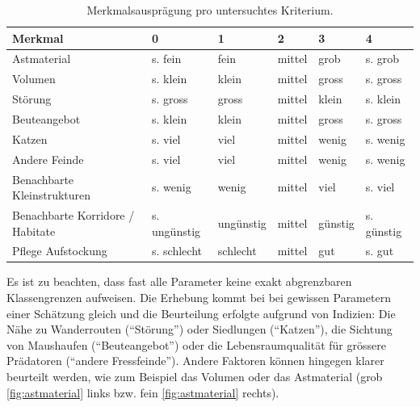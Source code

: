 \documentclass[
  oneside]{scrbook}
\begin{document}
\begin{table}

\caption{\label{tab:unnamed-chunk-3}Merkmalsausprägung pro untersuchtes Kriterium.}
\centering
\begin{tabular}[t]{l|l|l|l|l|l}
\hline
Merkmal & 0 & 1 & 2 & 3 & 4\\
\hline
Astmaterial & s. fein & fein & mittel & grob & s. grob\\
\hline
Volumen & s. klein & klein & mittel & gross & s. gross\\
\hline
Störung & s. gross & gross & mittel & klein & s. klein\\
\hline
Beuteangebot & s. klein & klein & mittel & gross & s. gross\\
\hline
Katzen & s. viel & viel & mittel & wenig & s. wenig\\
\hline
Andere Feinde & s. viel & viel & mittel & wenig & s. wenig\\
\hline
Benachbarte Kleinstrukturen & s. wenig & wenig & mittel & viel & s. viel\\
\hline
Benachbarte Korridore / Habitate & s. ungünstig & ungünstig & mittel & günstig & s. günstig\\
\hline
Pflege Aufstockung & s. schlecht & schlecht & mittel & gut & s. gut\\
\hline
\end{tabular}
\end{table}

Es ist zu beachten, dass fast alle Parameter keine exakt abgrenzbaren Klassengrenzen aufweisen. Die Erhebung kommt bei bei gewissen Parametern einer Schätzung gleich und die Beurteilung erfolgte aufgrund von Indizien: Die Nähe zu Wanderrouten (``Störung'') oder Siedlungen (``Katzen''), die Sichtung von Maushaufen (``Beuteangebot'') oder die Lebensraumqualität für grössere Prädatoren (``andere Fressfeinde'').
Andere Faktoren können hingegen klarer beurteilt werden, wie zum Beispiel das Volumen oder das Astmaterial (grob \ref{fig:astmaterial} links bzw. fein \ref{fig:astmaterial} rechts).
\end{document}
